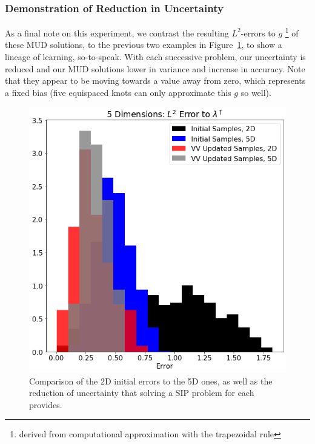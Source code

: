 \subsubsection{Demonstration of Reduction in Uncertainty}

As a final note on this experiment, we contrast the resulting $L^2$-errors to $g$ \footnote{derived from computational approximation with the trapezoidal rule} of these MUD solutions, to the previous two examples in Figure~\ref{fig:pde-highd-5d-hist}, to show a lineage of learning, so-to-speak.
With each successive problem, our uncertainty is reduced and our MUD solutions lower in variance and increase in accuracy.
Note that they appear to be moving towards a value away from zero, which represents a fixed bias (five equispaced knots can only approximate this $g$ so well).

\begin{figure}[htbp]
\centering
  \includegraphics[width=0.675\linewidth]{figures/pde-highd/pde-highd_hist_D5_t5-0E-01}
\caption{
Comparison of the 2D initial errors to the 5D ones, as well as the reduction of uncertainty that solving a SIP problem for each provides.
}
\label{fig:pde-highd-5d-hist}
\end{figure}
